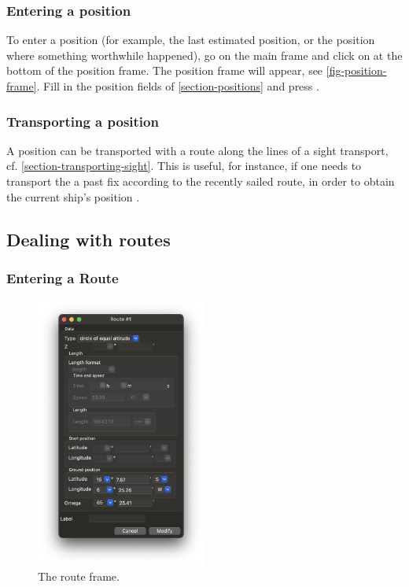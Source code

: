 \documentclass{ol-softwaremanual}
\begin{document}
\subsubsection{Entering a position}\label{section-enter-position}

To enter a position  (for example, the last estimated position, or the position where something worthwhile happened), go on the main frame and click on  at the bottom of the position frame. The position frame will appear, see \cref{fig-position-frame}. Fill in the position fields of \cref{section-positions} and press . 

\subsubsection{Transporting a position}\label{section-transport-position}

A position can be transported with a route along the lines of a sight transport, cf. \cref{section-transporting-sight}. This is useful, for instance, if one needs to transport the a past fix according to the recently sailed route, in order to obtain the current ship's position \cite{bowditch2002the}. 


\subsection{Dealing with routes}\label{section-routes}


\subsubsection{Entering a Route}\label{section-entering-route}

\begin{figure}
  \centering
  \includegraphics[width=0.5\textwidth]{figures/route-frame.png}
  \caption{
    \label{fig-route-frame}
    The route frame.  
  }
\end{figure}
\end{document}
